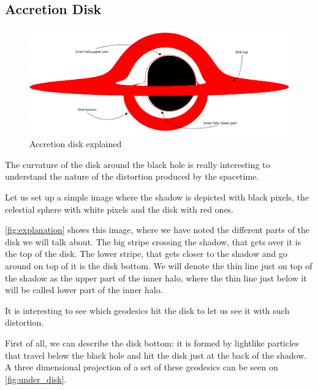 \subsection{Accretion Disk}

\begin{figure}[bth]
	\myfloatalign
	\includegraphics[width=\linewidth]{gfx/bh_simple}
	\caption[Accretion disk explained]{Accretion disk explained}
	\label{fig:explanation}
\end{figure}

The curvature of the disk around the black hole is really interesting to understand the nature of the distortion produced by the spacetime.

Let us set up a simple image where the shadow is depicted with black pixels, the celestial sphere with white pixels and the disk with red ones.

\autoref{fig:explanation} shows this image, where we have noted the different parts of the disk we will talk about. The big stripe crossing the shadow, that gets over it is the top of the disk. The lower stripe, that gets closer to the shadow and go around on top of it is the disk bottom. We will denote the thin line just on top of the shadow as the upper part of the inner halo, where the thin line just below it will be called lower part of the inner halo.

It is interesting to see which geodesics hit the disk to let us see it with such distortion.

First of all, we can describe the disk bottom: it is formed by lightlike particles that travel below the black hole and hit the disk just at the back of the shadow. A three dimensional projection of a set of these geodesics can be seen on \autoref{fig:under_disk}.

